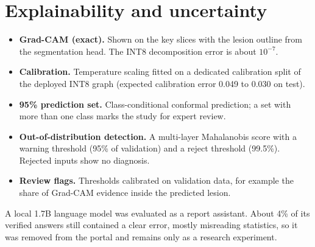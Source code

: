 \documentclass[11pt,a4paper]{article}
\begin{document}
\section{Explainability and uncertainty}
\begin{itemize}
\item \textbf{Grad-CAM (exact).} Shown on the key slices with the lesion outline from the segmentation head. The
INT8 decomposition error is about $10^{-7}$.
\item \textbf{Calibration.} Temperature scaling fitted on a dedicated calibration split of the deployed INT8 graph
(expected calibration error 0.049 to 0.030 on test).
\item \textbf{95\% prediction set.} Class-conditional conformal prediction; a set with more than one class marks the
study for expert review.
\item \textbf{Out-of-distribution detection.} A multi-layer Mahalanobis score with a warning threshold (95\% of
validation) and a reject threshold (99.5\%). Rejected inputs show no diagnosis.
\item \textbf{Review flags.} Thresholds calibrated on validation data, for example the share of Grad-CAM evidence
inside the predicted lesion.
\end{itemize}
A local 1.7B language model was evaluated as a report assistant. About 4\% of its verified answers still contained a
clear error, mostly misreading statistics, so it was removed from the portal and remains only as a research
experiment.

\end{document}
